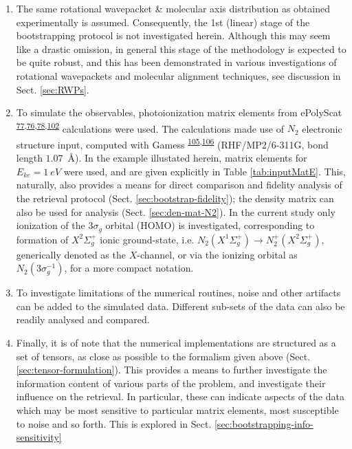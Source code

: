 \documentclass[10pt]{article}
\begin{document}
\begin{enumerate}
\item The same rotational wavepacket \& molecular axis distribution as obtained experimentally is assumed. Consequently, the 1st (linear) stage of the bootstrapping protocol is not investigated herein. Although this may seem like a drastic omission, in general this stage of the methodology is expected to be quite robust, and this has been demonstrated in various investigations of rotational wavepackets and molecular alignment techniques, see discussion in Sect. \ref{sec:RWPs}.
\item To simulate the observables, photoionization matrix elements from ePolyScat \textsuperscript{\hyperref[csl:77]{77},\hyperref[csl:76]{76},\hyperref[csl:78]{78},\hyperref[csl:102]{102}} calculations were used. The calculations made use of $N_2$ electronic structure input, computed with Gamess \textsuperscript{\hyperref[csl:105]{105},\hyperref[csl:106]{106}} (RHF/MP2/6-311G, bond length $1.07$~\AA). In the example illustated herein, matrix elements for $E_{ke}=1~eV$ were used, and are given explicitly in Table \ref{tab:inputMatE}. This, naturally, also provides a means for direct comparison and fidelity analysis of the retrieval protocol (Sect. \ref{sec:bootstrap-fidelity}); the density matrix can also be used for analysis (Sect. \ref{sec:den-mat-N2}). In the current study only ionization of the $3\sigma_g$ orbital (HOMO) is investigated, corresponding to formation of  $X^2\Sigma_{g}^{+}$ ionic ground-state, i.e. $N_2(X^{1}\Sigma^{+}_{g}) \rightarrow N^+_2(X^{2}\Sigma^{+}_{g})$, generically denoted as the $X$-channel, or via the ionizing orbital as $N_2(3\sigma_g^{-1})$, for a more compact notation. 
\item To investigate limitations of the numerical routines, noise and other artifacts can be added to the simulated data. Different sub-sets of the data can also be readily analysed and compared.
\item Finally, it is of note that the numerical implementations are structured as a set of tensors, as close as possible to the formalism given above (Sect. \ref{sec:tensor-formulation}). This provides a means to further investigate the information content of various parts of the problem, and investigate their influence on the retrieval. In particular, these can indicate aspects of the data which may be most sensitive to particular matrix elements, most susceptible to noise and so forth. This is explored in Sect. \ref{sec:bootstrapping-info-sensitivity}
\end{enumerate}
\end{document}
